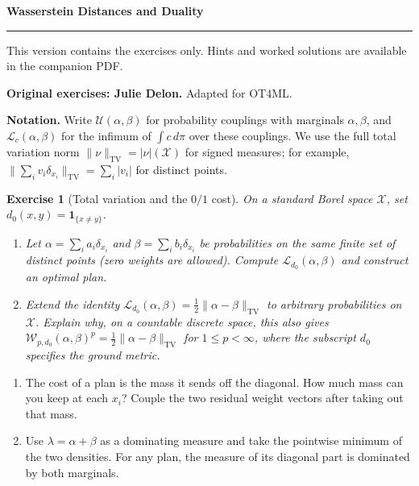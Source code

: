 \documentclass[11pt,a4paper]{article}
\theoremstyle{exostyle}
\newtheorem{exercise}{Exercise}
\newif\ifcorr
\renewcommand{\maketitle}{\thispagestyle{plain}\begingroup
  \color{heading}\LARGE\bfseries\SheetTitle\par\endgroup
  \vspace{3pt}{\large\ifcorr Statements, hints and worked solutions\else Exercise statements\fi}\par
  \vspace{7pt}\hrule\vspace{9pt}
  \ifcorr Each exercise is followed by question-by-question hints and a worked solution.
  Try the questions before reading the hints.\else
  This version contains the exercises only. Hints and worked solutions are available in the companion PDF.\fi
  \par\medskip}
\newcommand{\SheetTitle}{Wasserstein Distances and Duality}
\newcommand{\X}{\mathcal X}
\newcommand{\U}{\mathcal U}
\begin{document}
\maketitle
\textbf{Original exercises: Julie Delon.} Adapted for OT4ML.

\textbf{Notation.}
Write $\U(\alpha,\beta)$ for probability couplings with marginals
$\alpha,\beta$, and $\mathcal L_c(\alpha,\beta)$ for the infimum of
$\int c\,d\pi$ over these couplings. We use the full total variation
norm $\|\nu\|_{\mathrm{TV}}=|\nu|(\X)$ for signed measures; for example,
$\|\sum_i v_i\delta_{x_i}\|_{\mathrm{TV}}=\sum_i|v_i|$ for distinct points.

\begin{exercise}[Total variation and the $0/1$ cost]\label{ex-dd-tv}
On a standard Borel space $\X$, set $d_0(x,y)=\mathbf 1_{\{x\ne y\}}$.
\begin{enumerate}[label=(\alph*)]
\item Let $\alpha=\sum_i a_i\delta_{x_i}$ and
  $\beta=\sum_i b_i\delta_{x_i}$ be probabilities on the same finite
  set of distinct points (zero weights are allowed). Compute
  $\mathcal L_{d_0}(\alpha,\beta)$ and construct an optimal plan.
\item Extend the identity $\mathcal L_{d_0}(\alpha,\beta)=
  \tfrac12\|\alpha-\beta\|_{\mathrm{TV}}$ to arbitrary probabilities on
  $\X$. Explain why, on a countable discrete space, this also gives
  $\mathcal W_{p,d_0}(\alpha,\beta)^p=\tfrac12\|\alpha-\beta\|_{\mathrm{TV}}$
  for $1\le p<\infty$, where the subscript $d_0$ specifies the ground metric.
\end{enumerate}
\end{exercise}
\begin{hints}
\begin{enumerate}[label=(\alph*)]
\item The cost of a plan is the mass it sends off the diagonal.
  How much mass can you keep at each $x_i$? Couple the two residual
  weight vectors after taking out that mass.
\item Use $\lambda=\alpha+\beta$ as a dominating measure and take the
  pointwise minimum of the two densities. For any plan, the measure
  of its diagonal part is dominated by both marginals.
\end{enumerate}
\end{hints}
\end{document}
